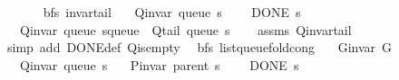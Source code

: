 \begin{isabellebody}
\ \ \ \ \isacommand{{\isachardot}{\kern0pt}}\isamarkupfalse%
\isanewline
{}\isamarkupfalse%
%
\endisatagproof
{\isafoldproof}%
%
\isadelimproof
\isanewline
%
\endisadelimproof
\isanewline
{}\isamarkupfalse%
\ {\isacharparenleft}{\kern0pt}\ bfs{\isacharparenright}{\kern0pt}\ invar{\isacharunderscore}{\kern0pt}tail{\isacharcolon}{\kern0pt}\isanewline
\ \ \ {\isachardoublequoteopen}Q{\isacharunderscore}{\kern0pt}invar\ {\isacharparenleft}{\kern0pt}queue\ s{\isacharparenright}{\kern0pt}{\isachardoublequoteclose}\isanewline
\ \ \ {\isachardoublequoteopen}{\isasymnot}\ DONE\ s{\isachardoublequoteclose}\isanewline
\ \ \ {\isachardoublequoteopen}Q{\isacharunderscore}{\kern0pt}invar\ {\isacharparenleft}{\kern0pt}queue\ {\isacharparenleft}{\kern0pt}s{\isasymlparr}queue\ {\isacharcolon}{\kern0pt}{\isacharequal}{\kern0pt}\ Q{\isacharunderscore}{\kern0pt}tail\ {\isacharparenleft}{\kern0pt}queue\ s{\isacharparenright}{\kern0pt}{\isasymrparr}{\isacharparenright}{\kern0pt}{\isacharparenright}{\kern0pt}{\isachardoublequoteclose}\isanewline
%
\isadelimproof
\ \ %
\endisadelimproof
%
\isatagproof
{}\isamarkupfalse%
\ assms\ Q{\isachardot}{\kern0pt}invar{\isacharunderscore}{\kern0pt}tail\isanewline
\ \ \isamarkupfalse%
\ {\isacharparenleft}{\kern0pt}simp\ add{\isacharcolon}{\kern0pt}\ DONE{\isacharunderscore}{\kern0pt}def\ Q{\isachardot}{\kern0pt}is{\isacharunderscore}{\kern0pt}empty{\isacharparenright}{\kern0pt}%
\endisatagproof
{\isafoldproof}%
%
\isadelimproof
\isanewline
%
\endisadelimproof
\isanewline
{}\isamarkupfalse%
\ {\isacharparenleft}{\kern0pt}\ bfs{\isacharparenright}{\kern0pt}\ list{\isacharunderscore}{\kern0pt}queue{\isacharunderscore}{\kern0pt}fold{\isacharunderscore}{\kern0pt}cong{\isacharunderscore}{\kern0pt}{}{\isacharcolon}{\kern0pt}\isanewline
\ \ \ {\isachardoublequoteopen}G{\isachardot}{\kern0pt}invar\ G{\isachardoublequoteclose}\isanewline
\ \ \ {\isachardoublequoteopen}Q{\isacharunderscore}{\kern0pt}invar\ {\isacharparenleft}{\kern0pt}queue\ s{\isacharparenright}{\kern0pt}{\isachardoublequoteclose}\isanewline
\ \ \ {\isachardoublequoteopen}P{\isacharunderscore}{\kern0pt}invar\ {\isacharparenleft}{\kern0pt}parent\ s{\isacharparenright}{\kern0pt}{\isachardoublequoteclose}\isanewline
\ \ \ {\isachardoublequoteopen}{\isasymnot}\ DONE\ s{\isachardoublequoteclose}\isanewline
\ \ \isanewline

\end{isabellebody}
